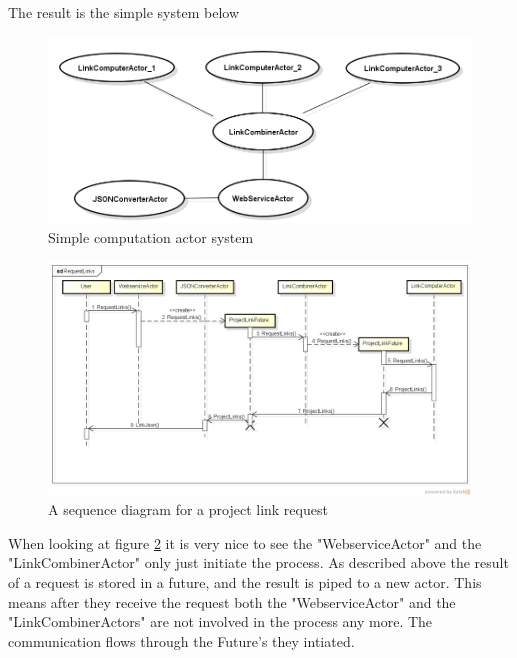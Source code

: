 \documentclass[10pt,a4paper]{article}
\begin{document}
The result is the simple system below

\begin{figure}[htb]
    \centering
    \includegraphics[width=1.00\textwidth]{ActorSystemSample}
    \caption{Simple computation actor system}
    \label{fig:actor_sample}
\end{figure}

\begin{figure}[htb]
    \centering
    \includegraphics[width=1.0\textwidth]{RequestLinks}
    \caption{A sequence diagram for a project link request}
    \label{fig:actor_seq}
\end{figure}



When looking at figure \ref{fig:actor_seq} it is very nice to see the "WebserviceActor" and the "LinkCombinerActor" only just initiate the process. As described above the result of a request is stored in a future, and the result is piped to a new actor. This means after they receive the request both the "WebserviceActor" and the "LinkCombinerActors" are not involved in the process any more. The communication flows through the Future's they intiated.
\end{document}
